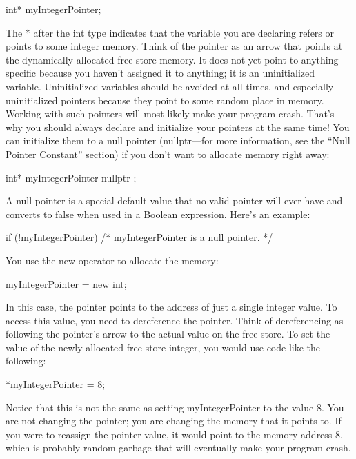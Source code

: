 \begin{cpp}
int* myIntegerPointer;
\end{cpp}

The * after the int type indicates that the variable you are declaring refers or points to some integer memory. Think of the pointer as an arrow that points at the dynamically allocated free store memory. It does not yet point to anything specific because you haven’t assigned it to anything; it is an uninitialized variable. Uninitialized variables should be avoided at all times, and especially uninitialized pointers because they point to some random place in memory. Working with such pointers will most likely make your program crash. That’s why you should always declare and initialize your pointers at the same time! You can initialize them to a null pointer (nullptr—for more information, see the “Null Pointer Constant” section) if you don’t want to allocate memory right away:

\begin{cpp}
int* myIntegerPointer { nullptr };
\end{cpp}

A null pointer is a special default value that no valid pointer will ever have and converts to false when used in a Boolean expression. Here’s an example:

\begin{cpp}
if (!myIntegerPointer) { /* myIntegerPointer is a null pointer. */ }
\end{cpp}

You use the new operator to allocate the memory:

\begin{cpp}
myIntegerPointer = new int;
\end{cpp}

In this case, the pointer points to the address of just a single integer value. To access this value, you need to dereference the pointer. Think of dereferencing as following the pointer’s arrow to the actual value on the free store. To set the value of the newly allocated free store integer, you would use code like the following:

\begin{cpp}
*myIntegerPointer = 8;
\end{cpp}

Notice that this is not the same as setting myIntegerPointer to the value 8. You are not changing the pointer; you are changing the memory that it points to. If you were to reassign the pointer value, it would point to the memory address 8, which is probably random garbage that will eventually make your program crash.

